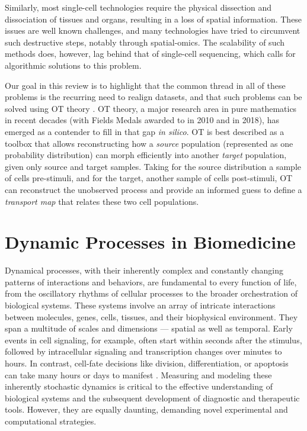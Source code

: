 %
Similarly, most single-cell technologies require the physical dissection and dissociation of tissues and organs, resulting in a loss of spatial information.
%
These issues are well known challenges, and many technologies have tried to circumvent such destructive steps, notably through spatial-omics. The scalability of such methods does, however, lag behind that of single-cell sequencing, which calls for algorithmic solutions to this problem.


Our goal in this review is to highlight that the common thread in all of these problems is the recurring need to realign datasets, and that such problems can be solved using \acrlong{OT} theory \citep{villani2021topics, santambrogio2015optimal}.
OT theory, a major research area in pure mathematics in recent decades (with Fields Medals awarded to \citeauthor{villani2021topics} in 2010 and \citeauthor{figalli2017monge} in 2018), has emerged as a contender to fill in that gap \textit{in silico}. OT is best described as a toolbox that allows reconstructing how a \emph{source} population (represented as one probability distribution) can morph efficiently into another \emph{target} population, given only source and target samples. Taking for the source distribution a sample of cells pre-stimuli, and for the target, another sample of cells post-stimuli, OT can reconstruct the unobserved process and provide an informed guess to define a \emph{transport map} that relates these two cell populations. 

\section{Dynamic Processes in Biomedicine}
\label{sec:bio_background}

Dynamical processes, with their inherently complex and constantly changing patterns of interactions and behaviors, are fundamental to every function of life, from the oscillatory rhythms of cellular processes to the broader orchestration of biological systems.
These systems involve an array of intricate interactions between molecules, genes, cells, tissues, and their biophysical environment. They span a multitude of scales and dimensions --- spatial as well as temporal.
Early events in cell signaling, for example, often start within seconds after the stimulus, followed by intracellular signaling and transcription changes over minutes to hours. In contrast, cell-fate decisions like division, differentiation, or apoptosis can take many hours or days to manifest \citep{spiller2010measurement}.
Measuring and modeling these inherently stochastic dynamics is critical to the effective understanding of biological systems and the subsequent development of diagnostic and therapeutic tools.
However, they are equally daunting, demanding novel experimental and computational strategies.

